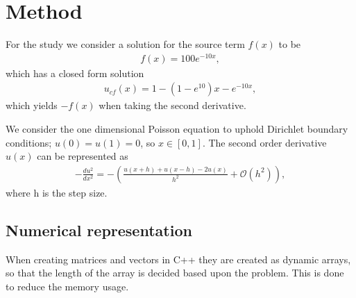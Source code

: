 \documentclass{emulateapj}
\begin{document}


\section{Method}
\label{sec:method}
For the study we consider a solution for the source term $f(x)$ to be
%
\begin{gather*}\label{eq:f(x)}
    f(x) = 100e^{-10x},
\end{gather*}
%
which has a closed form solution 
%
\begin{gather}\label{eq:u(x)}
u_{cf}(x) = 1-(1-e^{10})x-e^{-10x},
\end{gather}
%
which yields $-f(x)$ when taking the second derivative. 

We consider the one dimensional Poisson equation to uphold Dirichlet boundary conditions; $u(0)=u(1)=0$, so $x \in [0,1]$. The second order derivative $u(x)$ can be represented as
%
\begin{gather}\label{eq:du/dx}
 -\frac{du^2}{dx^2} = -\left(\frac{u(x+h) + u(x-h) - 2u(x)}{h^2} + \mathcal{O}(h^2)\right),
\end{gather}
%
where h is the step size. 

\subsection{Numerical representation}
When creating matrices and vectors in C++ they are created as dynamic arrays, so that the length of the array is decided based upon the problem. This is done to reduce the memory usage.
\end{document}
